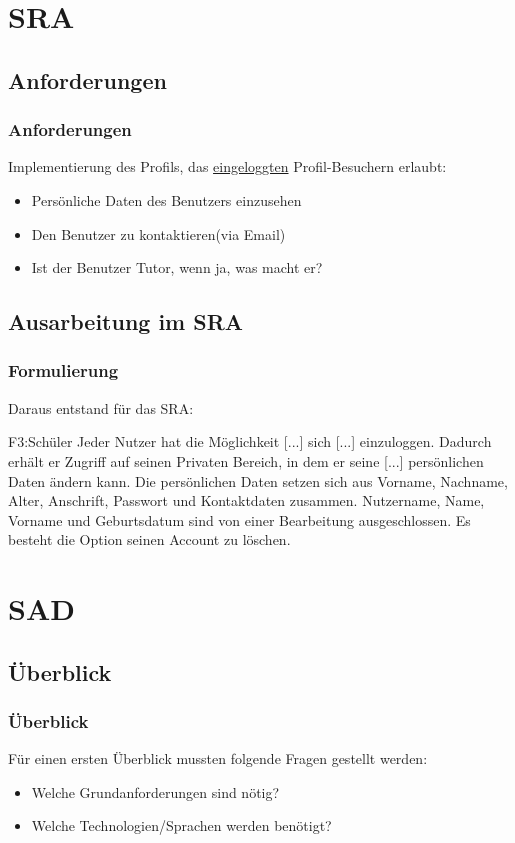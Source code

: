 \section{SRA}
\subsection{Anforderungen}
\begin{frame}
  \frametitle{Anforderungen}
 Implementierung des Profils, das \underline{eingeloggten} Profil-Besuchern erlaubt:
 \bigskip
 \begin{itemize}
  \item Persönliche Daten des Benutzers einzusehen
  \item Den Benutzer zu kontaktieren(via Email)
  \item Ist der Benutzer Tutor, wenn ja, was macht er?
 \end{itemize}
\end{frame}
\subsection{Ausarbeitung im SRA}
\begin{frame}
\frametitle{Formulierung}
 Daraus entstand für das SRA:
 \bigskip
  \begin{block}{F3:Schüler}
  Jeder Nutzer hat die Möglichkeit [...] sich [...] einzuloggen.
  Dadurch erhält er Zugriff auf seinen Privaten Bereich, in dem er seine [...] persönlichen Daten ändern kann.
  Die persönlichen Daten setzen sich aus Vorname, Nachname, Alter, Anschrift, Passwort und Kontaktdaten zusammen.
  Nutzername, Name, Vorname und Geburtsdatum sind von einer Bearbeitung ausgeschlossen.
  Es besteht die Option seinen Account zu löschen.
 \end{block}
\end{frame}

\section{SAD}
\subsection{Überblick}
\begin{frame}
\frametitle{Überblick}
 Für einen ersten Überblick mussten folgende Fragen gestellt werden:
 \begin{itemize}
  \item Welche Grundanforderungen sind nötig?
  \item Welche Technologien/Sprachen werden benötigt?
 \end{itemize}
\end{frame}
